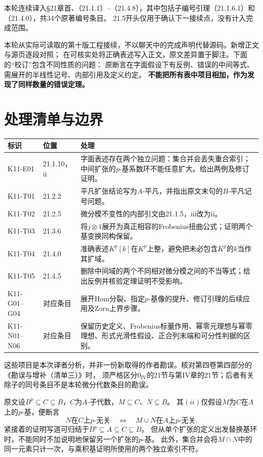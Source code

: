 本轮连续译入§21章首、（21.1.1）--（21.4.8），其中包括子编号引理（21.1.6.1）和（21.4.0），共34个原著编号条目。
21.5开头仅用于确认下一接续点，没有计入完成范围。

本轮从实际可读取的第十版工程接续，不以聊天中的完成声明代替源码。新增正文与源页逐段对照；
在可核实处将正确表述写入正文，原文差异置于脚注。下面的“校订”包含不同性质的问题：
原断言在字面假设下有反例、错误的中间等式、需展开的半线性记号、内部引用及定义约定。
\textbf{不能把所有表中项目相加，作为发现了同样数量的错误定理。}

\section*{处理清单与边界}
\begin{longtable}{@{}p{.17\linewidth}p{.17\linewidth}p{.57\linewidth}@{}}
\toprule 标识 & 位置 & 处理\\
\midrule\endhead
K11-E01 & 21.1.10，ii & 字面表述存在两个独立问题：集合并会丢失重合索引；中间扩张的$p$-基系数环不能任意扩大。给出两例及修订证明。\\
K11-T01 & 21.2.2 & 平凡扩张结论写为$A$-平凡，并指出原文末句的$B$-平凡记号问题。\\
K11-T02 & 21.2.5 & 微分模不变性的内部引文由21.1.5，iii改为ii。\\
K11-T03 & 21.3.6 & 将$j\otimes1$展开为真正相容的Frobenius扭曲公式；证明两个基变换同构保留。\\
K11-T04 & 21.4.0 & 准确表述$K^p[k]$在$K^p$上整，避免把未必包含$K^p$的$k$当作其扩域。\\
K11-T05 & 21.4.5 & 删除中间域的两个不同相对微分模之间的不当等式；给出反例并核验定理证明不受影响。\\
K11-G01--G04 & 对应条目 & 展开Hom分裂、指定$p$-基像的提升、修订引理的后续应用及Zorn上界步骤。\\
K11-N01--N06 & 对应条目 & 保留历史定义、Frobenius标量作用、幂零元理想与幂零理想、形式光滑性假设、正合列末端和可分性判据的区别。\\
\bottomrule
\end{longtable}
这些项目是本次译者分析，并非一份新取得的作者勘误。核对第四卷第四部分的《勘误与增补（清单三）》时，
须严格区分$0_{\mathrm{IV}}$的21节与第IV章的21节；后者有关除子的同号条目不是本轮微分代数条目的勘误。

原文设$B^p\subseteq C\subseteq B$，$C$为$A$-子代数，$M\subseteq C$、$N\subseteq B$。
其$(ii)$仅假设$M$为$C$在$A$上的$p$-基，便断言
\[
 N\text{在}C\text{上$p$-无关}
 \quad\Longleftrightarrow\quad
 M\cup N\text{在}A\text{上$p$-无关}.
\]
紧接着的证明写道可归结于$B^p\subseteq A\subseteq C\subseteq B$。
但从单个扩张的定义出发替换基环时，不能同时不加说明地保留另一个扩张的$p$-基。
此外，集合并会将$M\cap N$中的同一元素只计一次，与乘积基证明所使用的两个独立索引不符。

